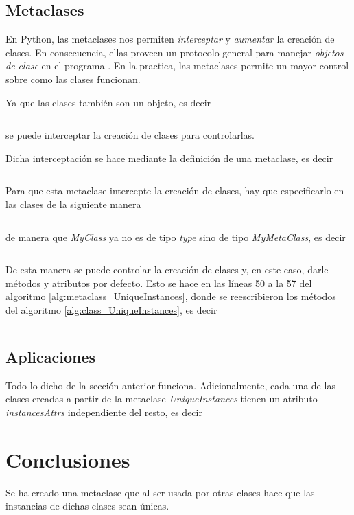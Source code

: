 \documentclass{article}
\begin{document}
	\subsection{Metaclases}
	En Python, las metaclases nos permiten \emph{interceptar} y \emph{aumentar} la creación de clases. En consecuencia, ellas proveen un protocolo general para manejar \emph{objetos de clase} en el programa \cite{lutz2013learning}.
	En la practica, las metaclases permite un mayor control sobre como las clases funcionan.

	Ya que las clases también son un objeto, es decir
	\inputminted[firstline=70, lastline=77]{python}{dumpy.py}
	se puede interceptar la creación de clases para controlarlas.

	Dicha interceptación se hace mediante la definición de una metaclase, es decir
	\inputminted[firstline=79, lastline=82]{python}{dumpy.py}

	Para que esta metaclase intercepte la creación de clases, hay que especificarlo en las clases de la siguiente manera
	\inputminted[firstline=84, lastline=85]{python}{dumpy.py}
	de manera que \emph{MyClass} ya no es de tipo \emph{type} sino de tipo \emph{MyMetaClass}, es decir
	\inputminted[firstline=87, lastline=87]{python}{dumpy.py}

	De esta manera se puede controlar la creación de clases y, en este caso, darle métodos y atributos por defecto. Esto se hace en las líneas 50 a la 57 del algoritmo \ref{alg:metaclass_UniqueInstances}, donde se reescribieron los métodos del algoritmo \ref{alg:class_UniqueInstances}, es decir
	\inputminted[firstline=50, lastline=57]{python}{collection.py}

	\subsection{Aplicaciones}

	Todo lo dicho de la sección anterior funciona. Adicionalmente, cada una de las clases creadas a partir de la metaclase \emph{UniqueInstances} tienen un atributo \emph{instancesAttrs} independiente del resto, es decir

	\section{Conclusiones}
	Se ha creado una metaclase que al ser usada por otras clases hace que las instancias de dichas clases sean únicas.

	
	
\end{document}
